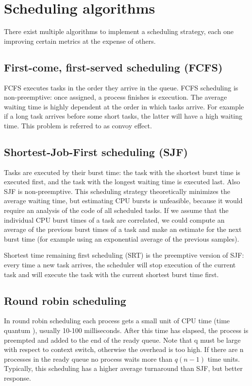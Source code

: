 \section{Scheduling algorithms}
There exist multiple algorithms to implement a scheduling strategy, each one improving certain metrics at the expense of others.
\subsection{First-come, first-served scheduling (FCFS)}
FCFS executes tasks in the order they arrive in the queue. FCFS scheduling is non-preemptive: once assigned, a process finishes is execution. The average waiting time is highly dependent at the order in which tasks arrive. For example if a long task arrives before some short tasks, the latter will have a high waiting time. This problem is referred to as convoy effect.
\subsection{Shortest-Job-First scheduling (SJF)}
Tasks are executed by their burst time: the task with the shortest burst time is executed first, and the task with the longest waiting time is executed last. Also SJF is non-preemptive. This scheduling strategy theoretically minimizes the average waiting time, but estimating CPU bursts is unfeasible, because it would require an analysis of the code of all scheduled tasks. If we assume that the individual CPU burst times of a task are correlated, we could compute an average of the previous burst times of a task and make an estimate for the next burst time (for example using an exponential average of the previous samples).

Shortest time remaining first scheduling (SRT) is the preemptive version of SJF: every time a new task arrives, the scheduler will stop execution of the current task and will execute the task with the current shortest burst time first.

\subsection{Round robin scheduling }
In round robin scheduling each process gets a small unit of CPU time (time quantum ), usually 10-100 milliseconds. After this time has elapsed, the process is preempted and added to the end of the ready queue. Note that q must be large with respect to context switch, otherwise the overhead is too high. If there are n processes in the ready queue no process waits more than $q(n-1)$ time units. Typically, this scheduling has a higher average turnaround than SJF, but better response.
